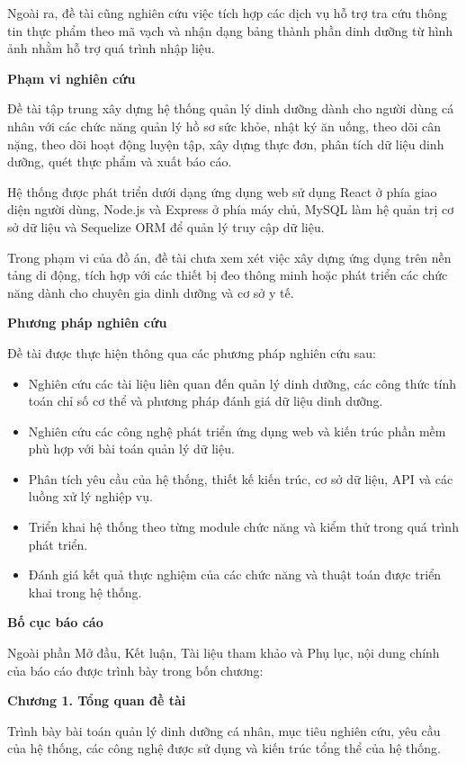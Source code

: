 \documentclass[12pt, a4paper]{report}
\begin{document}
Ngoài ra, đề tài cũng nghiên cứu việc tích hợp các dịch vụ hỗ trợ tra cứu thông tin thực phẩm theo mã vạch và nhận dạng bảng thành phần dinh dưỡng từ hình ảnh nhằm hỗ trợ quá trình nhập liệu.

\textbf{Phạm vi nghiên cứu}

Đề tài tập trung xây dựng hệ thống quản lý dinh dưỡng dành cho người dùng cá nhân với các chức năng quản lý hồ sơ sức khỏe, nhật ký ăn uống, theo dõi cân nặng, theo dõi hoạt động luyện tập, xây dựng thực đơn, phân tích dữ liệu dinh dưỡng, quét thực phẩm và xuất báo cáo.

Hệ thống được phát triển dưới dạng ứng dụng web sử dụng React ở phía giao diện người dùng, Node.js và Express ở phía máy chủ, MySQL làm hệ quản trị cơ sở dữ liệu và Sequelize ORM để quản lý truy cập dữ liệu.

Trong phạm vi của đồ án, đề tài chưa xem xét việc xây dựng ứng dụng trên nền tảng di động, tích hợp với các thiết bị đeo thông minh hoặc phát triển các chức năng dành cho chuyên gia dinh dưỡng và cơ sở y tế.

\textbf{Phương pháp nghiên cứu}

Đề tài được thực hiện thông qua các phương pháp nghiên cứu sau:

\begin{itemize}
\item Nghiên cứu các tài liệu liên quan đến quản lý dinh dưỡng, các công thức tính toán chỉ số cơ thể và phương pháp đánh giá dữ liệu dinh dưỡng.
\item Nghiên cứu các công nghệ phát triển ứng dụng web và kiến trúc phần mềm phù hợp với bài toán quản lý dữ liệu.
\item Phân tích yêu cầu của hệ thống, thiết kế kiến trúc, cơ sở dữ liệu, API và các luồng xử lý nghiệp vụ.
\item Triển khai hệ thống theo từng module chức năng và kiểm thử trong quá trình phát triển.
\item Đánh giá kết quả thực nghiệm của các chức năng và thuật toán được triển khai trong hệ thống.
\end{itemize}
\textbf{Bố cục báo cáo}

Ngoài phần Mở đầu, Kết luận, Tài liệu tham khảo và Phụ lục, nội dung chính của báo cáo được trình bày trong bốn chương:

\textbf{Chương 1. Tổng quan đề tài}

Trình bày bài toán quản lý dinh dưỡng cá nhân, mục tiêu nghiên cứu, yêu cầu của hệ thống, các công nghệ được sử dụng và kiến trúc tổng thể của hệ thống.
\end{document}
